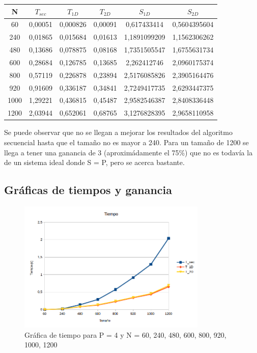 \begin{center}
\begin{tabular}{ | c | c c c | c c | }
	\hline
	N		&	$ T_{sec} $	&	$ T_{1D} $	&	$ T_{2D} $	 &	$ S_{1D} $	 	&	$ S_{2D} $		\\
	\hline
	60      &	0,00051 	&	0,000826 	&	0,00091 	&	0,617433414 	&	0,5604395604	\\
	240     &	0,01865 	&	0,015684 	&	0,01613 	&	1,1891099209 	&	1,1562306262	\\
	480     &	0,13686 	&	0,078875 	&	0,08168 	&	1,7351505547 	&	1,6755631734	\\
	600     &	0,28684 	&	0,126785 	&	0,13685 	&	2,262412746 	&	2,0960175374	\\
	800     &	0,57119 	&	0,226878 	&	0,23894 	&	2,5176085826 	&	2,3905164476	\\
	920     &	0,91609		&	0,336187 	&	0,34841 	&	2,7249417735 	&	2,6293447375	\\
	1000    &	1,29221		&	0,436815 	&	0,45487 	&	2,9582546387 	&	2,8408336448	\\
	1200    &	2,03944   	&	0,652061 	&	0,68765 	&	3,1276828395 	&	2,9658110958	\\
	\hline
\end{tabular}
\end{center}

Se puede observar que no se llegan a mejorar los resultados del algoritmo secuencial hasta que el tamaño no es mayor a 240. Para un tamaño de 1200 se llega a tener una ganancia de 3 (aproximádamente el 75\%) que no es todavía la de un sistema ideal donde S = P, pero se acerca bastante.

\subsection{Gráficas de tiempos y ganancia}

\begin{figure}[H]
	\centering
	\includegraphics[width=9cm]{img/tiempo}
	\caption{Gráfica de tiempo para P = 4 y N = 60, 240, 480, 600, 800, 920, 1000, 1200}
	\label{fig:grafica_tiempo}
\end{figure}

